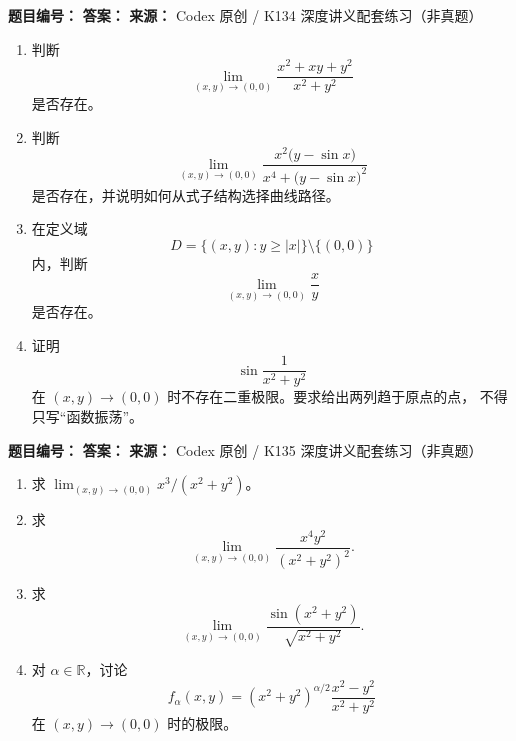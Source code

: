 \begin{problemBox}
\begin{problemMeta}
\textbf{题目编号：}  \quad
\textbf{答案：}  \quad
\textbf{来源：} Codex 原创 / K134 深度讲义配套练习（非真题）
\end{problemMeta}
\begin{enumerate}
\item[\textbf{A}] 判断
\[
\lim_{(x,y)\to(0,0)}
\frac{x^2+xy+y^2}{x^2+y^2}
\]
是否存在。
\item[\textbf{B}] 判断
\[
\lim_{(x,y)\to(0,0)}
\frac{x^2\bigl(y-\sin x\bigr)}
{x^4+\bigl(y-\sin x\bigr)^2}
\]
是否存在，并说明如何从式子结构选择曲线路径。
\item[\textbf{C}] 在定义域
\[
D=\{(x,y):y\ge |x|\}\setminus\{(0,0)\}
\]
内，判断
\[
\lim_{(x,y)\to(0,0)}\frac{x}{y}
\]
是否存在。
\item[\textbf{M}] 证明
\[
\sin\!\frac1{x^2+y^2}
\]
在 \((x,y)\to(0,0)\) 时不存在二重极限。要求给出两列趋于原点的点，
不得只写“函数振荡”。
\end{enumerate}
\end{problemBox}

\begin{problemBox}
\begin{problemMeta}
\textbf{题目编号：}  \quad
\textbf{答案：}  \quad
\textbf{来源：} Codex 原创 / K135 深度讲义配套练习（非真题）
\end{problemMeta}
\begin{enumerate}
\item[\textbf{A}] 求
\(\displaystyle\lim_{(x,y)\to(0,0)}x^3/(x^2+y^2)\)。
\item[\textbf{B}] 求
\[
\lim_{(x,y)\to(0,0)}
\frac{x^4y^2}{(x^2+y^2)^2}.
\]
\item[\textbf{C}] 求
\[
\lim_{(x,y)\to(0,0)}
\frac{\sin(x^2+y^2)}{\sqrt{x^2+y^2}}.
\]
\item[\textbf{M}] 对 \(\alpha\in\mathbb R\)，讨论
\[
f_\alpha(x,y)
=(x^2+y^2)^{\alpha/2}\frac{x^2-y^2}{x^2+y^2}
\]
在 \((x,y)\to(0,0)\) 时的极限。
\end{enumerate}
\end{problemBox}

